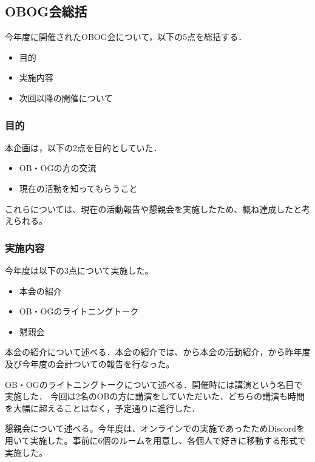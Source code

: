 \subsection*{OBOG会総括}


今年度に開催されたOBOG会について，以下の5点を総括する．
\begin{itemize}
    \item 目的
    \item 実施内容
    \item 次回以降の開催について
\end{itemize}

\subsubsection*{目的}

本企画は，以下の2点を目的としていた．

\begin{itemize}
    \item OB・OGの方の交流
    \item 現在の活動を知ってもらうこと
\end{itemize}

これらについては、現在の活動報告や懇親会を実施したため、概ね達成したと考えられる。

\subsubsection*{実施内容}

今年度は以下の3点について実施した。

\begin{itemize}
    \item 本会の紹介
    \item OB・OGのライトニングトーク
	\item 懇親会
\end{itemize}

本会の紹介について述べる．本会の紹介では、\president{}から本会の活動紹介，\kaikeiChief{}から昨年度及び今年度の会計ついての報告を行なった。

OB・OGのライトニングトークについて述べる．開催時には講演という名目で実施した．
今回は2名のOBの方に講演をしていただいた．どちらの講演も時間を大幅に超えることはなく，予定通りに進行した．

懇親会について述べる。今年度は、オンラインでの実施であったためDiscordを用いて実施した。事前に6個のルームを用意し、各個人で好きに移動する形式で実施した。

